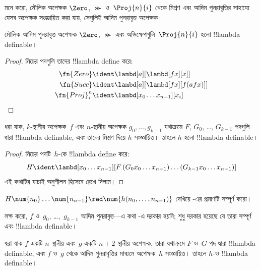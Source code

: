 \documentclass[../../../include/open-logic-section]{subfiles}
\begin{document}

মনে করো, মৌলিক অপেক্ষক $\Zero$, $\Succ$ ও~$\Proj{n}{i}$ থেকে মিশ্রণ এবং
আদিম পুনরাবৃত্তির সাহায্যে যেসব অপেক্ষক সংজ্ঞায়িত করা যায়, সেগুলিই
আদিম পুনরাবৃত্ত অপেক্ষক।

\begin{lem}
  মৌলিক আদিম পুনরাবৃত্ত অপেক্ষক $\Zero$, $\Succ$ এবং
  অভিক্ষেপগুলি~$\Proj{n}{i}$ হলো !!{lambda definable}।
\end{lem}

\begin{proof}
নিচের পদগুলি তাদের !!{lambda define} করে:
\begin{align*}
  \fn{Zero} & \ident \lambd[a][\lambd[fx][x]]\\
  \fn{Succ} & \ident \lambd[a][\lambd[fx][f (a f x)]] \\
  \fn{Proj}^n_i & \ident \lambd[x_0\dots x_{n-1}][x_i]
\end{align*}
\end{proof}

\begin{lem}
   ধরা যাক, $k$-স্থানীয় অপেক্ষক~$f$ এবং $n$-স্থানীয়
  অপেক্ষক $g_0, \dots, g_{k-1}$ যথাক্রমে $F$, $G_0$, \dots,
  $G_{k-1}$ পদগুলি দ্বারা !!{lambda definable}, এবং তাদের মিশ্রণ দিয়ে
  $h$ সংজ্ঞায়িত। তাহলে $h$ হলো !!{lambda definable}।
\end{lem}

\begin{proof}
  নিচের পদটি~$h$-কে !!{lambda define} করে:
  \[
  H \ident \lambd[x_0 \dots x_{n-1}][F\, (G_0 x_0 \dots
    x_{n-1}) \dots (G_{k-1} x_0 \dots x_{n-1})]
  \]
  এই কথাটির যাচাই অনুশীলন হিসেবে রেখে দিলাম।
\end{proof}

\begin{prob}
  $H\num{n_0}\dots\num{n_{n-1}} \red \num{h(n_0, \dots,
    n_{n-1})}$ দেখিয়ে -এর প্রমাণটি
  সম্পূর্ণ করো।
\end{prob}

লক্ষ করো, $f$ ও~$g_0$, \dots,~$g_{k-1}$ আদিম পুনরাবৃত্ত---এ কথা
-এ দরকার হয়নি; শুধু দরকার হয়েছে যে তারা সম্পূর্ণ এবং
!!{lambda definable}।

\begin{lem}
  ধরা যাক $f$ একটি $n$-স্থানীয় এবং~$g$ একটি $n+2$-স্থানীয় অপেক্ষক,
  তারা যথাক্রমে $F$ ও~$G$ পদ দ্বারা !!{lambda definable}, এবং $f$ ও~$g$
  থেকে আদিম পুনরাবৃত্তির মাধ্যমে অপেক্ষক~$h$ সংজ্ঞায়িত। তাহলে $h$-ও
  !!{lambda definable}।
\end{lem}
\end{document}
